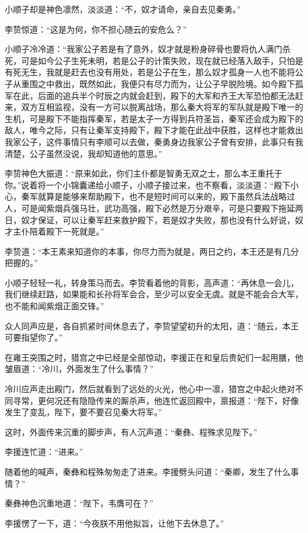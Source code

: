 小顺子却是神色凛然，淡淡道：“不，奴才请命，亲自去见秦勇。”

李贽惊道：“这是为何，你不担心随云的安危么？”

小顺子冷冷道：“我家公子若是有了意外，奴才就是粉身碎骨也要将仇人满门杀死，可是如今公子生死未明，若是公子的计策失败，现在就已经落入敌手，只怕是有死无生，我就是赶去也没有用处，若是公子在生，那么奴才孤身一人也不能将公子从重围之中救出，既然如此，我便只有尽力而为，让公子早脱险境。如今殿下孤军在此，后面的追兵半个时辰之内就会赶到，殿下的大军和齐王大军恐怕都无法赶来，双方互相监视，没有一方可以脱离战场，那么秦大将军的军队就是殿下唯一的生机，可是殿下不能指挥秦军，若是太子一方得到兵符圣旨，秦军还会成为殿下的敌人，唯今之际，只有让秦军支持殿下，殿下才能在此战中获胜，这样也才能救出我家公子，这件事情只有李顺可以去做，秦勇身边我家公子曾有安排，此事只有我清楚，公子虽然没说，我却知道他的意思。”

李贽神色大振道：“原来如此，你们主仆都是智勇无双之士，那么本王重托于你。”说着将一个小锦囊递给小顺子，小顺子接过来，也不察看，淡淡道：“殿下小心，秦军就算是能够来帮助殿下，也不是短时间可以来的，殿下虽然兵法战略过人，可是闻紫烟兵强马壮，武功高强，殿下必然是万分艰辛，可是只要殿下拖延两日，奴才保证，可以让秦军赶来救护殿下，若是奴才失败，那也没有什么好说，奴才主仆陪着殿下一死就是。”

李贽道：“本王素来知道你的本事，你尽力而为就是，两日之约，本王还是有几分把握的。”

小顺子轻轻一礼，转身策马而去。李贽看着他的背影，高声道：“再休息一会儿，我们继续赶路，如果能和长孙将军会合，至少可以安全无虞。就是不能会合大军，也不能和闻紫烟正面交锋。”

众人同声应是，各自抓紧时间休息去了，李贽望望初升的太阳，道：“随云，本王可要指望你了。”

在雍王突围之时，猎宫之中已经是全部惊动，李援正在和皇后贵妃们一起用膳，他皱眉道：“冷川，外面发生了什么事情？”

冷川应声走出殿门，然后就看到了远处的火光，他心中一凛，猎宫之中起火绝对不同寻常，更何况还有隐隐传来的厮杀声，他连忙返回殿中，禀报道：“陛下，好像发生了变乱，陛下，要不要召见秦大将军。”

这时，外面传来沉重的脚步声，有人沉声道：“秦彝、程殊求见陛下。”

李援连忙道：“进来。”

随着他的喊声，秦彝和程殊匆匆走了进来。李援劈头问道：“秦卿，发生了什么事情？”

秦彝神色沉重地道：“陛下，韦膺可在？”

李援愣了一下，道：“今夜朕不用他拟旨，让他下去休息了。”

